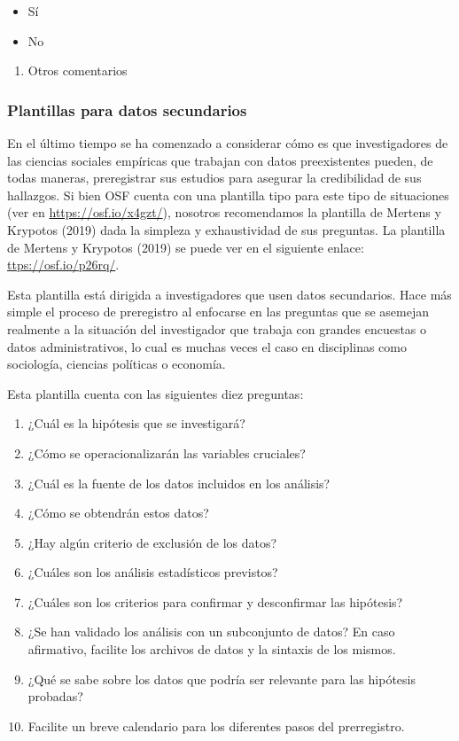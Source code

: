 \documentclass[
  spanish,
  letterpaper,
  DIV=11,
  numbers=noendperiod]{scrreprt}
\providecommand{\tightlist}{%
  \setlength{\itemsep}{0pt}\setlength{\parskip}{0pt}}
\begin{document}
\begin{itemize}
\tightlist
\item
  Sí
\item
  No
\end{itemize}

\begin{enumerate}
\def\labelenumi{\arabic{enumi}.}
\setcounter{enumi}{2}
\tightlist
\item
  Otros comentarios
\end{enumerate}

\subsubsection{Plantillas para datos
secundarios}\label{plantillas-para-datos-secundarios}

En el último tiempo se ha comenzado a considerar cómo es que
investigadores de las ciencias sociales empíricas que trabajan con datos
preexistentes pueden, de todas maneras, preregistrar sus estudios para
asegurar la credibilidad de sus hallazgos. Si bien OSF cuenta con una
plantilla tipo para este tipo de situaciones (ver en
\url{https://osf.io/x4gzt/}), nosotros recomendamos la plantilla de
Mertens y Krypotos (2019) dada la simpleza y exhaustividad de sus
preguntas. La plantilla de Mertens y Krypotos (2019) se puede ver en el
siguiente enlace: \href{https://osf.io/p26rq/}{ttps://osf.io/p26rq/}.

Esta plantilla está dirigida a investigadores que usen datos
secundarios. Hace más simple el proceso de preregistro al enfocarse en
las preguntas que se asemejan realmente a la situación del investigador
que trabaja con grandes encuestas o datos administrativos, lo cual es
muchas veces el caso en disciplinas como sociología, ciencias políticas
o economía.

Esta plantilla cuenta con las siguientes diez preguntas:

\begin{enumerate}
\def\labelenumi{\arabic{enumi}.}
\item
  ¿Cuál es la hipótesis que se investigará?
\item
  ¿Cómo se operacionalizarán las variables cruciales?
\item
  ¿Cuál es la fuente de los datos incluidos en los análisis?
\item
  ¿Cómo se obtendrán estos datos?
\item
  ¿Hay algún criterio de exclusión de los datos?
\item
  ¿Cuáles son los análisis estadísticos previstos?
\item
  ¿Cuáles son los criterios para confirmar y desconfirmar las hipótesis?
\item
  ¿Se han validado los análisis con un subconjunto de datos? En caso
  afirmativo, facilite los archivos de datos y la sintaxis de los
  mismos.
\item
  ¿Qué se sabe sobre los datos que podría ser relevante para las
  hipótesis probadas?
\item
  Facilite un breve calendario para los diferentes pasos del
  prerregistro.
\end{enumerate}
\end{document}
